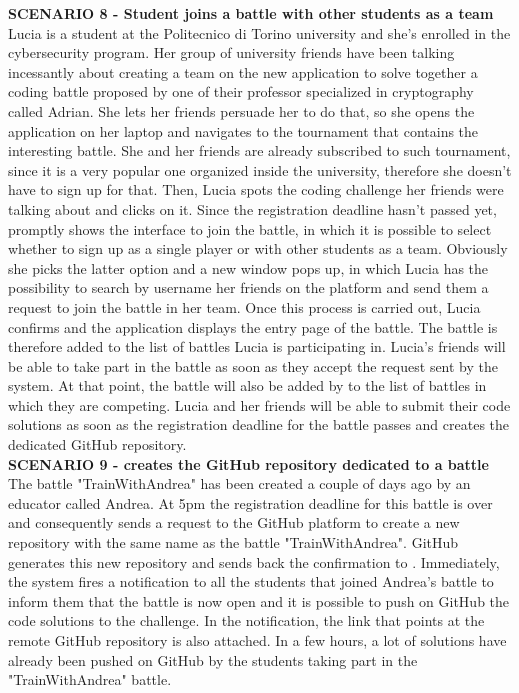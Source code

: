     \textbf{SCENARIO 8 - Student joins a battle with other students as a team}\\
    Lucia is a student at the Politecnico di Torino university and she's enrolled in the cybersecurity program. Her group of university friends have been talking incessantly about creating a team on the new \app application to solve together a coding battle proposed by one of their professor specialized in cryptography called Adrian. She lets her friends persuade her to do that, so she opens the \app application on her laptop and navigates to the tournament that contains the interesting battle. She and her friends are already subscribed to such tournament, since it is a very popular one organized inside the university, therefore she doesn't have to sign up for that. Then, Lucia spots the coding challenge her friends were talking about and clicks on it. Since the registration deadline hasn't passed yet, \app promptly shows the interface to join the battle, in which it is possible to select whether to sign up as a single player or with other students as a team. Obviously she picks the latter option and a new window pops up, in which Lucia has the possibility to search by username her friends on the platform and send them a request to join the battle in her team. Once this process is carried out, Lucia confirms and the \app application displays the entry page of the battle. The battle is therefore added to the list of battles Lucia is participating in.
    Lucia's friends will be able to take part in the battle as soon as they accept the request sent by the system. At that point, the battle will also be added by \app to the list of battles in which they are competing.
    Lucia and her friends will be able to submit their code solutions as soon as the registration deadline for the battle passes and \app creates the dedicated GitHub repository.\\
    
    \textbf{SCENARIO 9 - \app creates the GitHub repository dedicated to a battle}\\
     The battle "TrainWithAndrea" has been created a couple of days ago by an educator called Andrea. At 5pm the registration deadline for this battle is over and consequently \app sends a request to the GitHub platform to create a new repository with the same name as the battle "TrainWithAndrea". GitHub generates this new repository and sends back the confirmation to \app. Immediately, the system fires a notification to all the students that joined Andrea's battle to inform them that the battle is now open and it is possible to push on GitHub the code solutions to the challenge. In the notification, the link that points at the remote GitHub repository is also attached. In a few hours, a lot of solutions have already been pushed on GitHub by the students taking part in the "TrainWithAndrea" battle.\\
    

